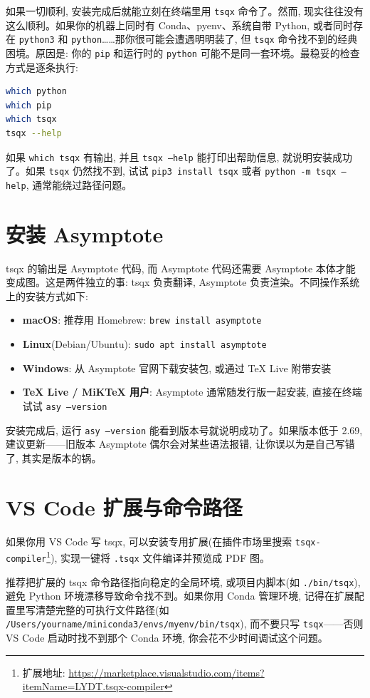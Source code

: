 \documentclass[11pt,oneside]{ctexbook}
\begin{document}
如果一切顺利, 安装完成后就能立刻在终端里用 \texttt{tsqx} 命令了。然而, 现实往往没有这么顺利。如果你的机器上同时有 Conda、pyenv、系统自带 Python, 或者同时存在 \texttt{python3} 和 \texttt{python}……那你很可能会遭遇明明装了, 但 \texttt{tsqx} 命令找不到的经典困境。原因是: 你的 \texttt{pip} 和运行时的 \texttt{python} 可能不是同一套环境。最稳妥的检查方式是逐条执行:
\begin{lstlisting}[language=bash]
which python
which pip
which tsqx
tsqx --help
\end{lstlisting}
如果 \texttt{which tsqx} 有输出, 并且 \texttt{tsqx --help} 能打印出帮助信息, 就说明安装成功了。如果 \texttt{tsqx} 仍然找不到, 试试 \texttt{pip3 install tsqx} 或者 \texttt{python -m tsqx --help}, 通常能绕过路径问题。

\section{安装 Asymptote}
tsqx 的输出是 Asymptote 代码, 而 Asymptote 代码还需要 Asymptote 本体才能变成图。这是两件独立的事: tsqx 负责翻译, Asymptote 负责渲染。不同操作系统上的安装方式如下:
\begin{itemize}
	\item \textbf{macOS}: 推荐用 Homebrew: \texttt{brew install asymptote}
	\item \textbf{Linux}(Debian/Ubuntu): \texttt{sudo apt install asymptote}
	\item \textbf{Windows}: 从 Asymptote 官网下载安装包, 或通过 TeX Live 附带安装
	\item \textbf{TeX Live / MiKTeX 用户}: Asymptote 通常随发行版一起安装, 直接在终端试试 \texttt{asy --version}
\end{itemize}

安装完成后, 运行 \texttt{asy --version} 能看到版本号就说明成功了。如果版本低于 2.69, 建议更新——旧版本 Asymptote 偶尔会对某些语法报错, 让你误以为是自己写错了, 其实是版本的锅。

\section{VS Code 扩展与命令路径}
如果你用 VS Code 写 tsqx, 可以安装专用扩展(在插件市场里搜索 \texttt{tsqx-compiler}\footnote{扩展地址: \url{https://marketplace.visualstudio.com/items?itemName=LYDT.tsqx-compiler}}), 实现一键将 \texttt{.tsqx} 文件编译并预览成 PDF 图。

推荐把扩展的 tsqx 命令路径指向稳定的全局环境, 或项目内脚本(如 \texttt{./bin/tsqx}), 避免 Python 环境漂移导致命令找不到。如果你用 Conda 管理环境, 记得在扩展配置里写清楚完整的可执行文件路径(如 \texttt{/Users/yourname/miniconda3/envs/myenv/bin/tsqx}), 而不要只写 \texttt{tsqx}——否则 VS Code 启动时找不到那个 Conda 环境, 你会花不少时间调试这个问题。
\end{document}
